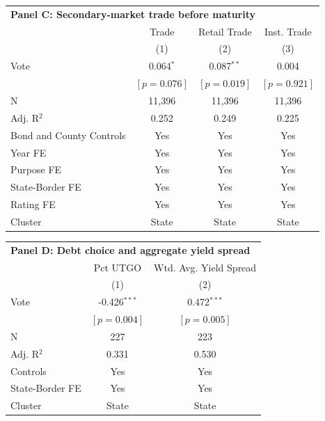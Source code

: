 \vspace{0.75em}

\begingroup
\centering
\begin{tabular*}{\textwidth}{@{\extracolsep{\fill}}lccc}
\multicolumn{4}{l}{\textbf{Panel C: Secondary-market trade before maturity}}\\

\addlinespace
   \toprule
 & Trade & Retail Trade & Inst. Trade\\
 & (1) & (2) & (3)\\
   \midrule 
Vote & 0.064$^{*}$ & 0.087$^{**}$ & 0.004\\
 & $[p=0.076]$ & $[p=0.019]$ & $[p=0.921]$\\
   \hline
N & 11,396 & 11,396 & 11,396\\
Adj. R$^2$ & 0.252 & 0.249 & 0.225\\
Bond and County Controls & Yes & Yes & Yes\\
Year FE & Yes & Yes & Yes\\
Purpose FE & Yes & Yes & Yes\\
State-Border FE & Yes & Yes & Yes\\
Rating FE & Yes & Yes & Yes\\
Cluster & State & State & State\\
   \bottomrule
\end{tabular*}
\par\endgroup

\vspace{0.75em}

\begingroup
\centering
\begin{tabular*}{\textwidth}{@{\extracolsep{\fill}}lcc}
\multicolumn{3}{l}{\textbf{Panel D: Debt choice and aggregate yield spread}}\\

\addlinespace
   \toprule
 & Pct UTGO & Wtd. Avg. Yield Spread\\
 & (1) & (2)\\
   \midrule 
Vote & -0.426$^{***}$ & 0.472$^{***}$\\
 & $[p=0.004]$ & $[p=0.005]$\\
   \hline
N & 227 & 223\\
Adj. R$^2$ & 0.331 & 0.530\\
Controls & Yes & Yes\\
State-Border FE & Yes & Yes\\
Cluster & State & State\\
   \bottomrule
\end{tabular*}
\par\endgroup
